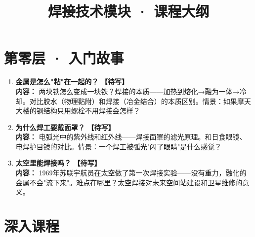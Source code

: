 \documentclass[a4paper,11pt]{ctexart}
\title{\textcolor{blue!70!black}{\Huge\textbf{焊接技术模块 · 课程大纲}}}
\author{}
\date{}
\newcommand{\draft}{\textcolor{orange!80!black}{\textbf{【待写】}}}
\begin{document}
\maketitle
\thispagestyle{empty}

\section*{第零层 · 入门故事}

\begin{enumerate}
\item[\textbf{第1课}] \textbf{金属是怎么"粘"在一起的？} \draft \\
\textbf{内容：} 两块铁怎么变成一块铁？焊接的本质——加热到熔化→融为一体→冷却。对比胶水（物理黏附）和焊接（冶金结合）的本质区别。情景：如果摩天大楼的钢结构只用螺栓不用焊接会怎样？
\item[\textbf{第2课}] \textbf{为什么焊工要戴面罩？} \draft \\
\textbf{内容：} 电弧光中的紫外线和红外线——焊接面罩的滤光原理。和日食眼镜、电焊护目镜的对比。情景：一个焊工被弧光"闪了眼睛"是什么感觉？
\item[\textbf{第3课}] \textbf{太空里能焊接吗？} \draft \\
\textbf{内容：} 1969年苏联宇航员在太空做了第一次焊接实验——没有重力，融化的金属不会"流下来"。难点在哪里？太空焊接对未来空间站建设和卫星维修的意义。
\end{enumerate}

\section*{深入课程}
\end{document}
